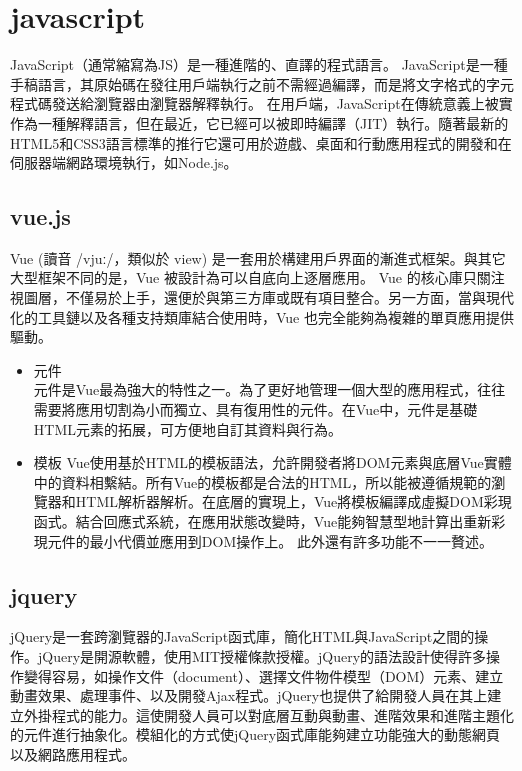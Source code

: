 \section{javascript}
JavaScript（通常縮寫為JS）是一種進階的、直譯的程式語言。
JavaScript是一種手稿語言，其原始碼在發往用戶端執行之前不需經過編譯，而是將文字格式的字元程式碼發送給瀏覽器由瀏覽器解釋執行。
在用戶端，JavaScript在傳統意義上被實作為一種解釋語言，但在最近，它已經可以被即時編譯（JIT）執行。隨著最新的HTML5和CSS3語言標準的推行它還可用於遊戲、桌面和行動應用程式的開發和在伺服器端網路環境執行，如Node.js。\cite{name11}

\subsection{vue.js}
Vue (讀音 /vjuː/，類似於 view) 是一套用於構建用戶界面的漸進式框架。與其它大型框架不同的是，Vue 被設計為可以自底向上逐層應用。 Vue 的核心庫只關注視圖層，不僅易於上手，還便於與第三方庫或既有項目整合。另一方面，當與現代化的工具鏈以及各種支持類庫結合使用時，Vue 也完全能夠為複雜的單頁應用提供驅動。\cite{name12}
\begin{itemize}
	\item 元件\\
	元件是Vue最為強大的特性之一。為了更好地管理一個大型的應用程式，往往需要將應用切割為小而獨立、具有復用性的元件。在Vue中，元件是基礎HTML元素的拓展，可方便地自訂其資料與行為。
	\item 模板
	Vue使用基於HTML的模板語法，允許開發者將DOM元素與底層Vue實體中的資料相繫結。所有Vue的模板都是合法的HTML，所以能被遵循規範的瀏覽器和HTML解析器解析。在底層的實現上，Vue將模板編譯成虛擬DOM彩現函式。結合回應式系統，在應用狀態改變時，Vue能夠智慧型地計算出重新彩現元件的最小代價並應用到DOM操作上。\cite{name13}
	此外還有許多功能不一一贅述。
\end{itemize}

\subsection{jquery}
jQuery是一套跨瀏覽器的JavaScript函式庫，簡化HTML與JavaScript之間的操作。jQuery是開源軟體，使用MIT授權條款授權。jQuery的語法設計使得許多操作變得容易，如操作文件（document）、選擇文件物件模型（DOM）元素、建立動畫效果、處理事件、以及開發Ajax程式。jQuery也提供了給開發人員在其上建立外掛程式的能力。這使開發人員可以對底層互動與動畫、進階效果和進階主題化的元件進行抽象化。模組化的方式使jQuery函式庫能夠建立功能強大的動態網頁以及網路應用程式。\cite{name14}\cite{name15}

